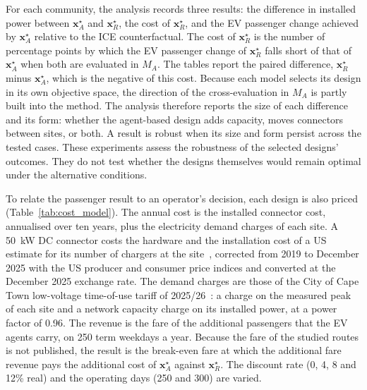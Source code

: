 \documentclass{elsarticle}
\newcommand{\MA}{\ensuremath{M_A}}
\newcommand{\xR}{\ensuremath{\mathbf{x}_R^{\star}}}
\newcommand{\xA}{\ensuremath{\mathbf{x}_A^{\star}}}
\begin{document}
For each community, the analysis records three results: the difference in installed power between \(\xA\) and \(\xR\), the cost of \(\xR\), and the EV passenger change achieved by \(\xA\) relative to the ICE counterfactual. The cost of \(\xR\) is the number of percentage points by which the EV passenger change of \(\xR\) falls short of that of \(\xA\) when both are evaluated in \(\MA\). The tables report the paired difference, \(\xR\) minus \(\xA\), which is the negative of this cost. Because each model selects its design in its own objective space, the direction of the cross-evaluation in \(\MA\) is partly built into the method. The analysis therefore reports the size of each difference and its form: whether the agent-based design adds capacity, moves connectors between sites, or both. A result is robust when its size and form persist across the tested cases. These experiments assess the robustness of the selected designs' outcomes. They do not test whether the designs themselves would remain optimal under the alternative conditions.

To relate the passenger result to an operator's decision, each design is also priced (Table~\ref{tab:cost_model}). The annual cost is the installed connector cost, annualised over ten years, plus the electricity demand charges of each site. A 50~kW DC connector costs the hardware and the installation cost of a US estimate for its number of chargers at the site~\cite{nicholas2019_icct_charging_costs}, corrected from 2019 to December 2025 with the US producer and consumer price indices and converted at the December 2025 exchange rate. The demand charges are those of the City of Cape Town low-voltage time-of-use tariff of 2025/26~\cite{coct2025_electricity_tariffs}: a charge on the measured peak of each site and a network capacity charge on its installed power, at a power factor of 0.96. The revenue is the fare of the additional passengers that the EV agents carry, on 250 term weekdays a year. Because the fare of the studied routes is not published, the result is the break-even fare at which the additional fare revenue pays the additional cost of \(\xA\) against \(\xR\). The discount rate (0, 4, 8 and 12\% real) and the operating days (250 and 300) are varied.

\end{document}
